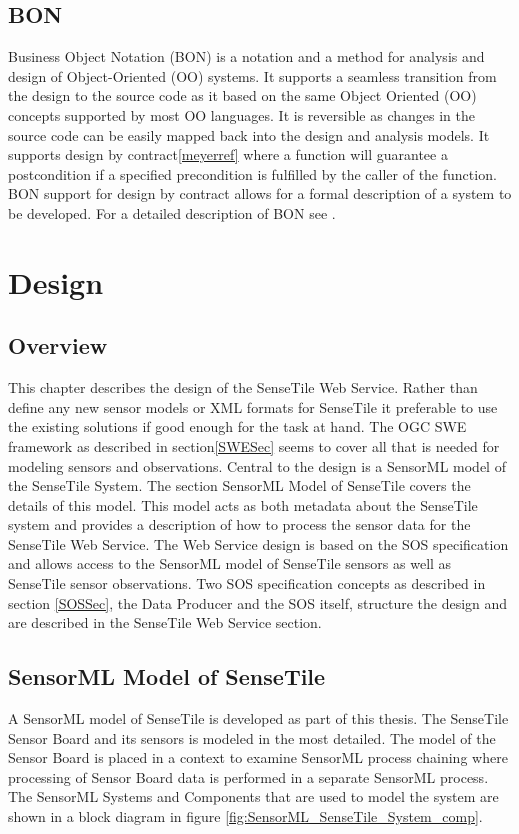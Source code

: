 \documentclass[]{final_report}
\begin{document}
\section{BON} \label{BONsec}
Business Object Notation (BON) is a notation and a method for analysis and design of Object-Oriented (OO) systems. It supports a seamless transition from the design to the source code as it based on the same Object Oriented (OO) concepts supported by most OO languages. It is reversible as changes in the source code can be easily mapped back into the design and analysis models. It supports design by contract\ref{meyerref} where a function will guarantee a postcondition if a specified precondition is fulfilled by the caller of the function. BON support for design by contract allows for a formal description of a system to be developed. For a detailed description of BON see \cite{BONref}.
\chapter{Design}
\section{Overview}
This chapter describes the design of the SenseTile Web Service. Rather than define any new sensor models or XML formats for SenseTile it preferable to use the existing solutions if good enough for the task at hand. The OGC SWE framework as described in section\ref{SWESec} seems to cover all that is needed for modeling sensors and observations. Central to the design is a SensorML model of the SenseTile System. The section SensorML Model of SenseTile covers the details of this model. This model acts as both metadata about the SenseTile system and provides a description of how to process the sensor data for the SenseTile Web Service.
The Web Service design is based on the SOS specification and allows access to the SensorML model of SenseTile sensors as well as SenseTile sensor observations. Two SOS specification concepts as described in section \ref{SOSSec}, the Data Producer and the SOS itself, structure the design and are described in the SenseTile Web Service section.

\section{SensorML Model of SenseTile}\label{SenseTileModelSec}

A SensorML model of SenseTile is developed as part of this thesis. The SenseTile Sensor Board and its sensors is modeled in the most detailed. The model of the Sensor Board is placed in a context to examine SensorML process chaining where processing of Sensor Board data is performed in a separate SensorML process.  The SensorML Systems and Components that are used to model the system are shown in a  block diagram in figure \ref{fig:SensorML_SenseTile_System_comp}.
\end{document}
